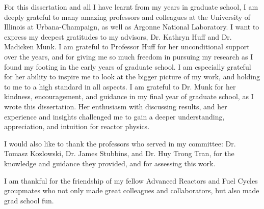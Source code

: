 For this dissertation and all I have learnt from my years in graduate school, 
I am deeply grateful to many amazing professors and colleagues at the University of 
Illinois at Urbana-Champaign, as well as Argonne National Laboratory. 
I want to express my deepest gratitudes to my advisors, Dr. Kathryn Huff and Dr. 
Madicken Munk. 
I am grateful to Professor Huff for her unconditional support over the years, and for 
giving me so much freedom in pursuing my research as I found my footing in the early 
years of graduate school. 
I am especially grateful for her ability to inspire me to look at the bigger picture of 
my work, and holding to me to a high standard in all aspects.
I am grateful to Dr. Munk for her kindness, encouragement, and guidance in my final year 
of graduate school, as I wrote this dissertation. 
Her enthusiasm with discussing results, and her experience and insights challenged me to 
gain a deeper understanding, appreciation, and intuition for reactor physics.  

I would also like to thank the professors who served in my committee: Dr. Tomasz 
Kozlowski, Dr. James Stubbins, and Dr. Huy Trong Tran, for the knowledge and guidance 
they provided, and for assessing this work. 

I am thankful for the friendship of my fellow Advanced Reactors and Fuel Cycles 
groupmates who not only made great colleagues and collaborators, but also made 
grad school fun. 








